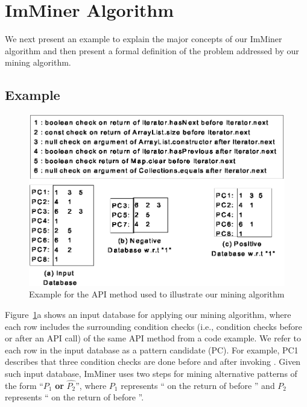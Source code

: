 \section{ImMiner Algorithm}
\label{sec:imminer}

We next present an example to explain the major concepts of our ImMiner algorithm and then present a formal definition of the problem addressed by our mining algorithm.

\subsection{Example}

\begin{figure}[t]
\centering
\includegraphics[scale=0.75,clip]{figs/miningex1.eps}\vspace*{-1ex}
\caption{Example for the  API method used to illustrate our mining algorithm} \label{fig:miningex}
\vspace*{-1ex}
\end{figure}

Figure~\ref{fig:miningex}a shows an input database for applying our mining algorithm, where each row includes the surrounding condition checks (i.e., condition checks before or after an API call) of the same API method from a code example. We refer to each row in the input database as a pattern candidate (PC). For example, PC1 describes that three condition checks are done before and after invoking . Given such input database, ImMiner uses two steps for mining alternative patterns of the form ``$P_1$ \textbf{or} $\hat{P_2}$'', where $P_1$ represents `` on the return of  before '' and $P_2$ represents `` on the return of  before ''.

